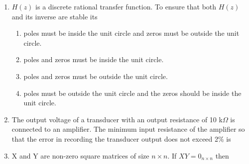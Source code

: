 \documentclass[journal,12pt,onecolumn]{IEEEtran}
\theoremstyle{remark}
\begin{document}
\begin{enumerate}
\item $H(z)$ is a discrete rational transfer function. To ensure that both $H(z)$ and its inverse are stable its

\hfill{}\begin{enumerate}
    \item poles must be inside the unit circle and zeros must be outside the unit circle.
    \item poles and zeros must be inside the unit circle.
    \item poles and zeros must be outside the unit circle.
    \item poles must be outside the unit circle and the zeros should be inside the unit circle.
 \end{enumerate}

\vspace{0.5cm}

\item The output voltage of a transducer with an output resistance of 10 k$\Omega$ is connected to an amplifier. The minimum input resistance of the amplifier so that the error in recording the transducer output does not exceed 2\% is

\hfill{}
\begin{enumerate}
 \end{enumerate}

\newpage

\item X and Y are non-zero square matrices of size $n \times n$. If $XY=0_{n \times n}$ then

\hfill{}\begin{enumerate}  \end{enumerate}


\end{enumerate}
\end{document}
